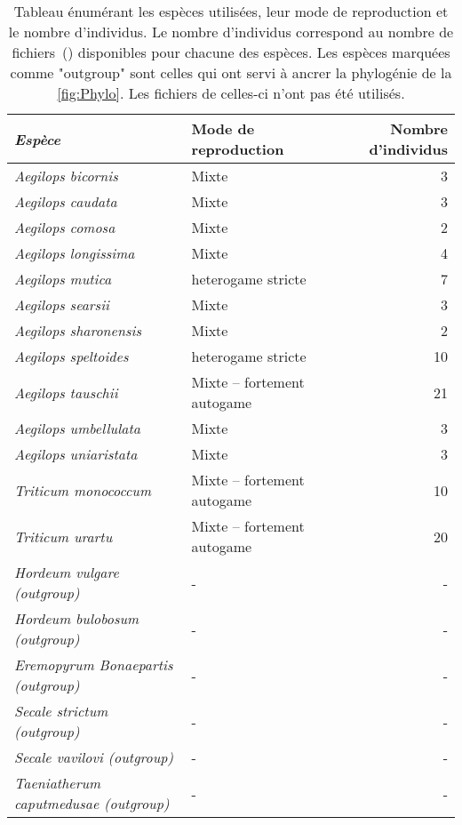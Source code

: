 \documentclass[../main]{subfiles} %
\begin{document}
\addto\extrasfrench{\protected\edef:{\unexpanded\expandafter{:}}}

\begin{table}[ht]
    \centering
    \begin{tabular}{>{\itshape}l l r}
        \toprule
        Espèce & Mode de reproduction & Nombre d’individus \\
        \midrule
        Aegilops bicornis & Mixte & 3 \\
        Aegilops caudata & Mixte & 3 \\
        Aegilops comosa & Mixte & 2 \\
        Aegilops longissima & Mixte & 4 \\
        Aegilops mutica & \Gls{heterogame}  stricte & 7 \\
        Aegilops searsii & Mixte & 3 \\
        Aegilops sharonensis & Mixte & 2 \\
        Aegilops speltoides & \Gls{heterogame}  stricte & 10 \\
        Aegilops tauschii & Mixte – fortement \gls{autogame} & 21 \\
        Aegilops umbellulata & Mixte & 3 \\
        Aegilops uniaristata & Mixte & 3 \\
        Triticum monococcum & Mixte – fortement \gls{autogame} & 10 \\
        Triticum urartu & Mixte – fortement \gls{autogame} & 20 \\

        Hordeum vulgare (\gls{outgroup}) & - & - \\
        Hordeum bulobosum (\gls{outgroup})  & - & - \\
        Eremopyrum Bonaepartis (\gls{outgroup}) & - & - \\
        Secale strictum (\gls{outgroup}) & - & - \\
        Secale vavilovi (\gls{outgroup}) & - & - \\
        Taeniatherum caputmedusae (\gls{outgroup}) & - & - \\
        \bottomrule

        
    \end{tabular}
    \caption{Tableau énumérant les espèces utilisées, leur mode de reproduction et le nombre d'individus. Le nombre d'individus correspond au nombre de fichiers \bam\,(\OldBam) disponibles pour chacune des espèces. Les espèces marquées comme "\gls{outgroup}" sont celles qui ont servi à ancrer la phylogénie de la \cref{fig:Phylo}. Les fichiers \bam de celles-ci n'ont pas été utilisés.
    \label{tab:Especes}
    }

    
\end{table}

\end{document}
